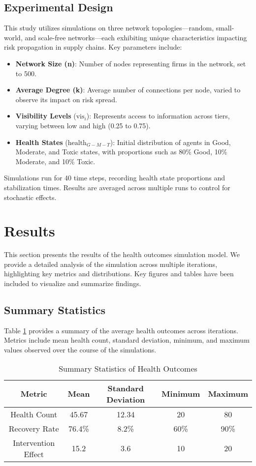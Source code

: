\documentclass{article}
\begin{document}
\subsection{Experimental Design}
This study utilizes simulations on three network topologies—random, small-world, and scale-free networks—each exhibiting unique characteristics impacting risk propagation in supply chains. Key parameters include:

\begin{itemize}
    \item \textbf{Network Size (n)}: Number of nodes representing firms in the network, set to 500.
    \item \textbf{Average Degree (k)}: Average number of connections per node, varied to observe its impact on risk spread.
    \item \textbf{Visibility Levels} (\( \text{vis}_i \)): Represents access to information across tiers, varying between low and high (0.25 to 0.75).
    \item \textbf{Health States} (\( \text{health}_{G-M-T} \)): Initial distribution of agents in Good, Moderate, and Toxic states, with proportions such as 80\% Good, 10\% Moderate, and 10\% Toxic.
\end{itemize}

Simulations run for 40 time steps, recording health state proportions and stabilization times. Results are averaged across multiple runs to control for stochastic effects.


\section{Results}

This section presents the results of the health outcomes simulation model. We provide a detailed analysis of the simulation across multiple iterations, highlighting key metrics and distributions. Key figures and tables have been included to visualize and summarize findings.

\subsection{Summary Statistics}

Table \ref{tab:summary_stats} provides a summary of the average health outcomes across iterations. Metrics include mean health count, standard deviation, minimum, and maximum values observed over the course of the simulations.

\begin{table}[H]
    \centering
    \caption{Summary Statistics of Health Outcomes}
    \label{tab:summary_stats}
    \begin{tabular}{|c|c|c|c|c|}
        \hline
        Metric & Mean & Standard Deviation & Minimum & Maximum \\
        \hline
        Health Count & 45.67 & 12.34 & 20 & 80 \\
        Recovery Rate & 76.4\% & 8.2\% & 60\% & 90\% \\
        Intervention Effect & 15.2 & 3.6 & 10 & 20 \\
        \hline
    \end{tabular}
\end{table}
\end{document}
